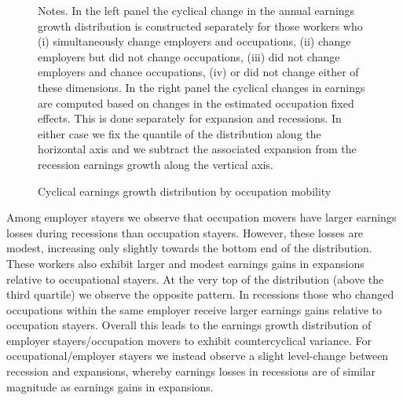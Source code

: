 \documentclass[12pt]{article}
\theoremstyle{definition}
\begin{document}
\begin{figure}[H]
    \noindent\caption{Cyclical earnings growth distribution by occupation mobility}
    \begin{center}
    \end{center}
    \vspace{-20pt}
    {\footnotesize Notes. In the left panel the cyclical change in the annual earnings growth distribution is constructed separately for those workers who (i) simultaneously change employers and occupations, (ii) change employers but did not change occupations, (iii) did not change employers and chance occupations, (iv) or did not change either of these dimensions. In the right panel the cyclical changes in earnings are computed based on changes in the estimated occupation fixed effects. This is done separately for expansion and recessions. In either case we fix the quantile of the distribution along the horizontal axis and we subtract the associated expansion from the recession earnings growth along the vertical axis.}
    \label{carrillo-tudelaCyclicalEarningsCareer2022_fig4}
\end{figure}

Among employer stayers we observe that occupation movers have larger earnings losses during recessions than occupation stayers. However, these losses are modest, increasing only slightly towards the bottom end of the distribution. These workers also exhibit larger and modest earnings gains in expansions relative to occupational stayers. At the very top of the distribution (above the third quartile) we observe the opposite pattern. In recessions those who changed occupations within the same employer receive larger earnings gains relative to occupation stayers. Overall this leads to the earnings growth distribution of employer stayers/occupation movers to exhibit countercyclical variance. For occupational/employer stayers we instead observe a slight level-change between recession and expansions, whereby earnings losses in recessions are of similar magnitude as earnings gains in expansions.
\end{document}
